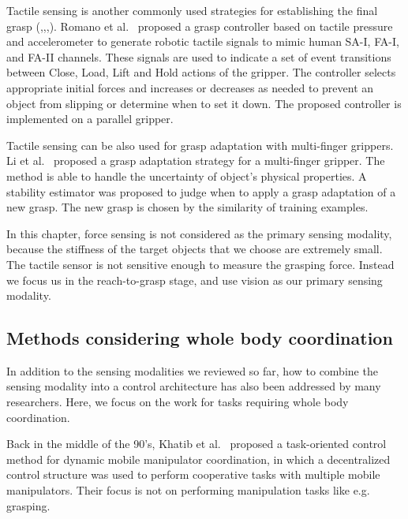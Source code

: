 Tactile sensing is another commonly used strategies for establishing the final grasp (\cite{Dang2014},\cite{Dragiev2013},\cite{Laaksonen2012},\cite{jiang2012seashell}). Romano et al.~\cite{Romano2011} proposed a grasp controller based on tactile pressure and accelerometer to generate robotic tactile signals to mimic human SA-I, FA-I, and FA-II channels. These signals are used to indicate a set of event transitions between Close, Load, Lift and Hold actions of the gripper. The controller selects appropriate initial forces and increases or decreases as needed to prevent an object from slipping or determine when to set it down. The proposed controller is implemented on a parallel gripper. 

Tactile sensing can be also used for grasp adaptation with multi-finger grippers. Li et al.~\cite{Li2014} proposed a grasp adaptation strategy for a multi-finger gripper. The method is able to handle the uncertainty of object's physical properties. A stability estimator was proposed to judge when to apply a grasp adaptation of a new grasp. The new grasp is chosen by the similarity of training examples. 

In this chapter, force sensing is not considered as the primary sensing modality, because the stiffness of the target objects that we choose are extremely small. The tactile sensor is not sensitive enough to measure the grasping force. Instead we focus us in the reach-to-grasp stage, and use vision as our primary sensing modality. 


 
\subsection{Methods considering whole body coordination}
In addition to the sensing modalities we reviewed so far, how to combine the sensing modality into a control architecture has also been addressed by many researchers. Here, we focus on the work for tasks requiring whole body coordination.

 Back in the middle of the 90's, Khatib et al.~\cite{Khatib1996} proposed a task-oriented control method for dynamic mobile manipulator coordination, in which a decentralized control structure was used to perform cooperative tasks with multiple mobile manipulators. Their focus is not on performing manipulation tasks like e.g. grasping.

